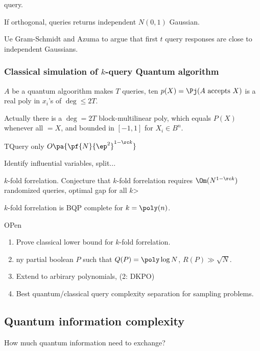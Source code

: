 query.

If orthogonal, queries returns independent $N(0,1)$ Gaussian.

Ue Gram-Schmidt and Azuma to argue that first $t$ query responses are close to independent Gaussians.



\subsubsection{Classical simulation of $k$-query Quantum algorithm}
$A$ be a quantum algoorithm makes $T$ queries, ten $p(X)=\Pj(A\text{ accepts }X)$ is a real poly in $x_i$'s of $\deg\le 2T$. 

Actually there is a $\deg=2T$ block-multilinear poly, which equals $P(X)$ whenever all $=X$, and bounded in $[-1,1]$  for $X_i\in B^n$.

\begin{thm}
TQuery only $O\pa{\pf{N}{\ep^2}^{1-\rc k}}$
\end{thm}
Identify influential variables, split...

$k$-fold forrelation. Conjecture that $k$-fold forrelation requires $\Om(N^{1-\rc k})$ randomized queries, optimal gap for all $k$>

$k$-fold forrelation is BQP complete for $k=\poly(n)$.

OPen
\begin{enumerate}
\item
Prove classical lower bound for $k$-fold forrelation.
\item
ny partial boolean $P$ such that $Q(P)=\poly\log N$, $R(P)\gg \sqrt N$.
\item
Extend to arbirary polynomials, (2: DKPO)
\item
Best quantum/classical query complexity separation for sampling problems.
\end{enumerate}



\subsection{Quantum information complexity}

How much quantum information need to exchange?

